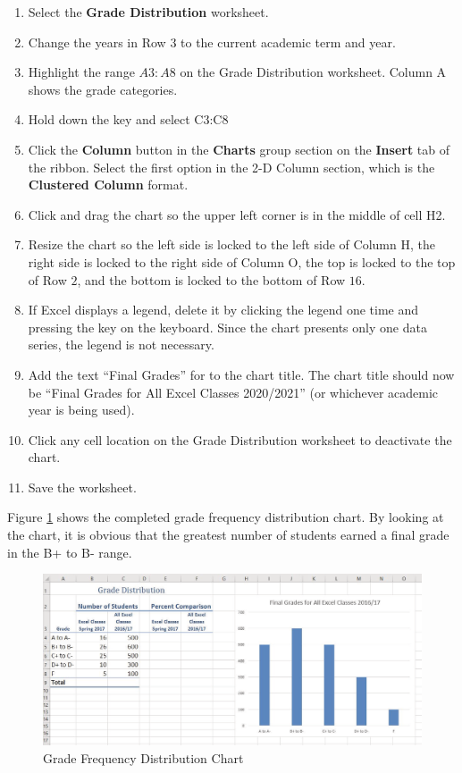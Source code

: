 \begin{enumerate}
	\item Select the \textbf{Grade Distribution} worksheet.
	\item Change the years in Row $ 3 $ to the current academic term and year.
	\item Highlight the range $ A3:A8 $ on the Grade Distribution worksheet. Column A shows the grade categories.
	\item Hold down the  key and select \textsf{C3:C8}
	\item Click the \textbf{Column} button in the \textbf{Charts} group section on the \textbf{Insert} tab of the ribbon. Select the first option in the 2-D Column section, which is the \textbf{Clustered Column} format.
	\item Click and drag the chart so the upper left corner is in the middle of cell \textsf{H2}.
	\item Resize the chart so the left side is locked to the left side of Column H, the right side is locked to the right side of Column O, the top is locked to the top of Row $ 2 $, and the bottom is locked to the bottom of Row $ 16 $.
	\item If Excel displays a legend, delete it by clicking the legend one time and pressing the  key on the keyboard. Since the chart presents only one data series, the legend is not necessary.
	\item Add the text ``Final Grades'' for to the chart title. The chart title should now be ``Final Grades for All Excel Classes 2020/2021'' (or whichever academic year is being used).
	\item Click any cell location on the Grade Distribution worksheet to deactivate the chart.
	\item Save the worksheet.
\end{enumerate}

Figure \ref{04:fig13} shows the completed grade frequency distribution chart. By looking at the chart, it is obvious that the greatest number of students earned a final grade in the B+ to B- range.

\begin{figure}[H]
	\centering
	\includegraphics[width=\maxwidth{.95\linewidth}]{gfx/ch04_fig13}
	\caption{Grade Frequency Distribution Chart}
	\label{04:fig13}
\end{figure}

